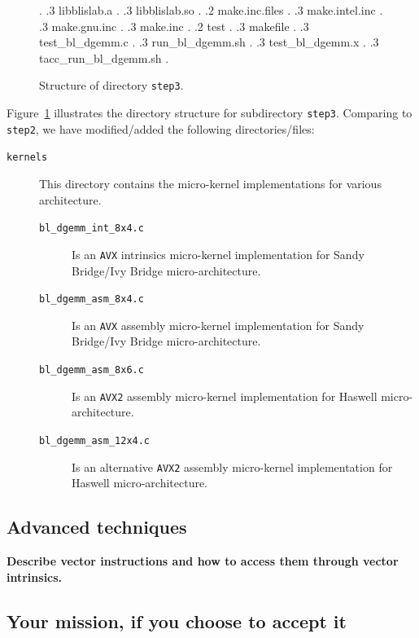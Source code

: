 \begin{figure}[tb!]
\begin{center}
\begin{minipage}{4in}
{%
.
        .3 libblislab.a
.
        .3 libblislab.so
.
		.2 make.inc.files
.
		.3 make.intel.inc 
.
		.3 make.gnu.inc 
.
		.3 make.inc 
.
		.2 test 
.
		.3 makefile 
.
		.3 test\_bl\_dgemm.c 
.
		.3 run\_bl\_dgemm.sh 
.
		.3 test\_bl\_dgemm.x 
.       
		.3 tacc\_run\_bl\_dgemm.sh 
.	
	}
\end{minipage}
\end{center}
\caption{Structure of directory {\tt step3}.}
\label{fig:DirStep1}
\end{figure}

Figure~\ref{fig:DirStep1} illustrates the directory
structure for subdirectory {\tt step3}. Comparing to {\tt step2}, we have modified/added the following directories/files:

\begin{description}
\item[{\tt kernels}] This directory contains the micro-kernel implementations for various architecture.
\begin{description}
\item[{\tt bl\_dgemm\_int\_8x4.c}] Is an {\tt AVX} intrinsics micro-kernel implementation for Sandy Bridge/Ivy Bridge micro-architecture.
\item[{\tt bl\_dgemm\_asm\_8x4.c}] Is an {\tt AVX} assembly micro-kernel implementation for Sandy Bridge/Ivy Bridge micro-architecture.
\item[{\tt bl\_dgemm\_asm\_8x6.c}] Is an {\tt AVX2} assembly micro-kernel implementation for Haswell micro-architecture.
\item[{\tt bl\_dgemm\_asm\_12x4.c}] Is an alternative {\tt AVX2} assembly micro-kernel implementation for Haswell micro-architecture.
\end{description}
\end{description}

\subsection{Advanced techniques}

{\bf Describe vector instructions and how to access them through vector intrinsics.}

\subsection{Your mission, if you choose to accept it}


